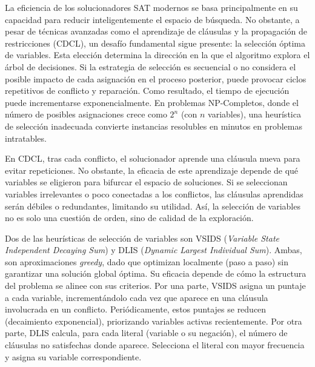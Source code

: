 
La eficiencia de los solucionadores SAT modernos se basa principalmente en su capacidad para reducir inteligentemente el espacio de b\'usqueda. No obstante, a pesar de t\'ecnicas avanzadas como el aprendizaje de cláusulas y la propagación de restricciones (CDCL), un desaf\'io fundamental sigue presente: la selección óptima de variables. Esta elección determina la dirección en la que el algoritmo explora el árbol de decisiones. Si la estrategia de selección es secuencial o no considera el posible impacto de cada asignación en el proceso posterior, puede provocar ciclos repetitivos de conflicto y reparación. Como resultado, el tiempo de ejecución puede incrementarse exponencialmente. En problemas NP-Completos, donde el número de posibles asignaciones crece como $2^n$ (con $n$ variables), una heurística de selección inadecuada convierte instancias resolubles en minutos en problemas intratables.

En CDCL, tras cada conflicto, el solucionador aprende una cláusula nueva para evitar repeticiones. No obstante, la eficacia de este aprendizaje depende de qué variables se eligieron para bifurcar el espacio de soluciones. Si se seleccionan variables irrelevantes o poco conectadas a los conflictos, las cláusulas aprendidas serán débiles o redundantes, limitando su utilidad. Así, la selección de variables no es solo una cuestión de orden, sino de calidad de la exploración.

Dos de las heurísticas de selección de variables son VSIDS (\textit{Variable State Independent Decaying Sum}) y DLIS (\textit{Dynamic Largest Individual Sum}). Ambas, son aproximaciones \textit{greedy}, dado que optimizan localmente (paso a paso) sin garantizar una solución global óptima. Su eficacia depende de cómo la estructura del problema se alinee con sus criterios. Por una parte, VSIDS asigna un puntaje a cada variable, incrementándolo cada vez que aparece en una cláusula involucrada en un conflicto. Periódicamente, estos puntajes se reducen (decaimiento exponencial), priorizando variables activas recientemente. Por otra parte, DLIS calcula, para cada literal (variable o su negación), el número de cláusulas no satisfechas donde aparece. Selecciona el literal con mayor frecuencia y asigna su variable correspondiente.

